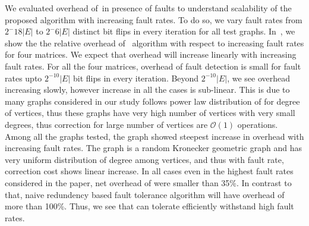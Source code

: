 We evaluated overhead of~\ftsv in presence of faults to understand scalability of the proposed algorithm 
with increasing fault rates. To do so, we vary fault rates from $2^-{18}|E|$ to $2^-{6}|E|$ distinct bit
flips in every iteration for all test graphs. In~, we show the the relative overhead 
of ~\ftsv algorithm with respect to increasing fault rates for four matrices.
We expect that overhead will increase linearly with increasing fault rates.
For all the four matrices, overhead of fault detection is small for fault rates upto $2^{-10}|E|$ bit flips 
in every iteration. Beyond $2^{-10}|E|$, we see overhead increasing slowly, however increase in all the cases 
is sub-linear. 
This is due to many graphs considered in our study follows power law distribution of for degree of vertices, thus
these graphs have very high number of vertices with very small degrees, thus correction 
for large number of vertices are $\mathcal{O}(1)$ operations. 
Among all the graphs tested, the graph  showed steepest increase in overhead with increasing
 fault rates. The graph  is a random Kronecker geometric graph and
  has very uniform distribution of degree among vertices, and 
  thus with fault rate, correction cost shows  linear increase. 
In all cases even in the highest fault rates considered in the paper, net overhead of \ftsv were smaller than 35\%.
 In contrast to that, naive redundency based fault tolerance algorithm will have overhead of more than 100\%. 
 Thus, we see that \ftsv can tolerate efficiently withstand high fault rates.  





